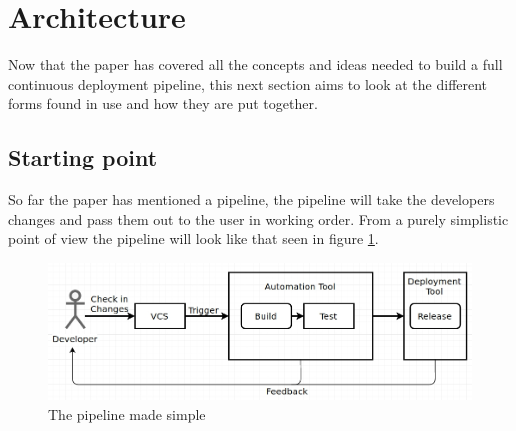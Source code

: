 %
%
%
%
%
%

\section{Architecture}

Now that the paper has covered all the concepts and ideas needed to build a full continuous deployment pipeline, this next section aims to look at the different forms found in use and how they are put together.

\subsection{Starting point}

So far the paper has mentioned a pipeline, the pipeline will take the developers changes and pass them out to the user in working order. From a purely simplistic point of view the pipeline will look like that seen in figure \ref{fig:pipeline-simple}.

\begin{figure}[H]
	\centering
	\includegraphics[scale=0.45]{images/pipeline-simple.jpg}
	\caption{The pipeline made simple}
	\label{fig:pipeline-simple}
\end{figure}

